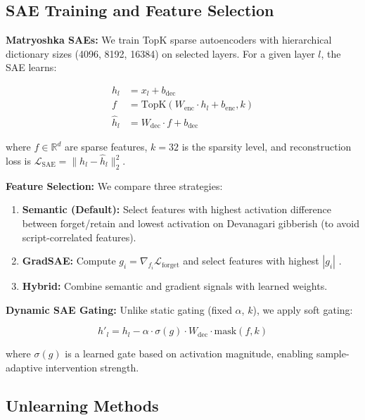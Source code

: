 \documentclass[11pt]{article}
\begin{document}
\subsection{SAE Training and Feature Selection}

\textbf{Matryoshka SAEs:} We train TopK sparse autoencoders \cite{gao2024scaling} with hierarchical dictionary sizes (4096, 8192, 16384) on selected layers. For a given layer $l$, the SAE learns:

\begin{align}
    h_l &= x_l + b_{\text{dec}} \\
    f &= \text{TopK}(W_{\text{enc}} \cdot h_l + b_{\text{enc}}, k) \\
    \hat{h}_l &= W_{\text{dec}} \cdot f + b_{\text{dec}}
\end{align}

where $f \in \mathbb{R}^d$ are sparse features, $k=32$ is the sparsity level, and reconstruction loss is $\mathcal{L}_{\text{SAE}} = \|h_l - \hat{h}_l\|_2^2$.

\textbf{Feature Selection:} We compare three strategies:

\begin{enumerate}
    \item \textbf{Semantic (Default):} Select features with highest activation difference between forget/retain and lowest activation on Devanagari gibberish (to avoid script-correlated features).
    \item \textbf{GradSAE:} Compute $g_i = \nabla_{f_i} \mathcal{L}_{\text{forget}}$ and select features with highest $|g_i|$ \cite{gradsae2025}.
    \item \textbf{Hybrid:} Combine semantic and gradient signals with learned weights.
\end{enumerate}

\textbf{Dynamic SAE Gating:} Unlike static gating (fixed $\alpha$, $k$), we apply soft gating:

\begin{equation}
    h'_l = h_l - \alpha \cdot \sigma(g) \cdot W_{\text{dec}} \cdot \text{mask}(f, k)
\end{equation}

where $\sigma(g)$ is a learned gate based on activation magnitude, enabling sample-adaptive intervention strength.

\subsection{Unlearning Methods}
\end{document}
